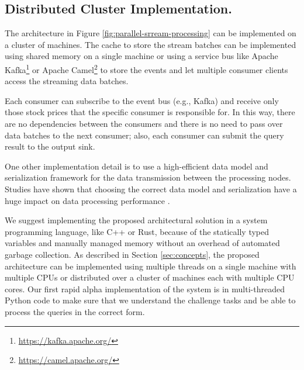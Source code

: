\subsection{Distributed Cluster Implementation.}
The architecture in Figure \ref{fig:parallel-srream-processing} can be implemented on a cluster of machines. 
The cache to store the stream batches can be implemented using shared memory on a single machine or using a service bus like 
Apache Kafka\footnote{\url{https://kafka.apache.org/}} or Apache Camel\footnote{\url{https://camel.apache.org/}} to store
the events and let multiple consumer clients access the streaming data batches.

Each consumer can subscribe to the event bus (e.g., Kafka) and receive only those stock prices that the specific consumer is responsible
for. In this way, there are no dependencies between the consumers and there is no need to pass over data batches to the next
consumer; also, each consumer can submit the query result to the output sink.

One other implementation detail is to use a high-efficient data model and serialization framework for the data transmission between
the processing nodes. Studies have shown that choosing the correct data model and serialization have a huge impact on data processing performance \cite{DBLP:conf/cloud/SikdarTJ17}.

We suggest implementing the proposed architectural solution in a system programming language, like C++ or Rust, because of the statically typed variables 
and manually managed memory without an overhead of automated garbage collection. As described in Section \ref{sec:concepts}, the proposed architecture 
can be implemented using multiple threads on a single machine with multiple CPUs or distributed over a cluster of machines each with multiple CPU cores.
Our first rapid alpha implementation of the system is in multi-threaded Python code to make sure that we understand the challenge tasks and be able to process the queries in the correct form.







